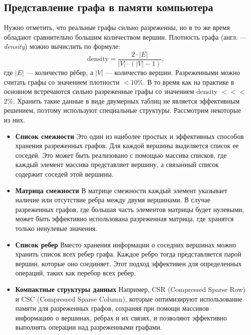 \subsection{Представление графа в памяти компьютера}
Нужно отметить, что реальные графы сильно разреженны, но в то же время обладают сравнительно большим количеством вершин.
Плотность графа (англ. --- \textit{density}) можно вычислить по формуле: 
\begin{equation}
\label{eq:density}
	\text{density} = \frac{2 \cdot |E|}{|V| \cdot (|V| - 1)},
\end{equation}
где $|E|$ --- {количество рёбер}, а $|V|$ --- количество вершин.\linebreak
Разреженными можно считать графы со значением плотности $<10\%$. В то время как на практике в основном встречаются сильно разреженные графы со значением density $<<<$ $2\%$. \newline
Хранить такие данные в виде двумерных таблиц не является эффективным решением, поэтому используют специальные структуры. Рассмотрим некоторые из них.
\begin{itemize}
	\item{\textbf{Список смежности}} \newline
	Это один из наиболее простых и эффективных способов хранения разреженных графов. Для каждой вершины выделяется список ее соседей. Это может быть реализовано с помощью массива списков, где каждый элемент массива представляет вершину, а связанный список содержит соседей этой вершины.
    \item{\textbf{Матрица смежности}} \newline 
    В матрице смежности каждый элемент указывает наличие или отсутствие ребра между двумя вершинами. В случае разреженных графов, где большая часть элементов матрицы будет нулевыми, может быть эффективно использована разреженная матрица, где хранятся только ненулевые значения.
    \item{\textbf{Список ребер}} \newline 
    Вместо хранения информации о соседних вершинах можно хранить список всех ребер графа. Каждое ребро тогда представляется парой вершин, которые оно соединяет. Этот подход эффективен для определенных операций, таких как перебор всех ребер.
    \item{\textbf{Компактные структуры данных}} \newline
    Например, CSR (Compressed Sparse Row) и CSC (Compressed Sparse Column), которые оптимизируют использование памяти для разреженных графов, сохраняя при помощи массивов информацию о вершинах, ребрах и их связях, и позволяют эффективно выполнять операции над разреженными графами.
\end{itemize}

